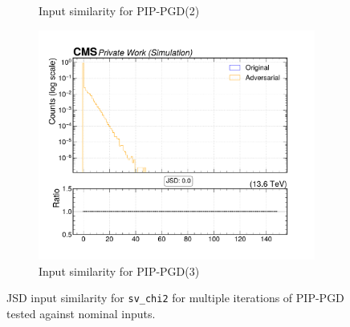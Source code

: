 \begin{figure}[htbp]
\begin{subfigure}[t]{0.32\textwidth}
    \caption*{Input similarity for PIP-PGD(2)}
  \end{subfigure}\hfill
  \begin{subfigure}[t]{0.32\textwidth}
    \includegraphics[width=\linewidth]{media/output/features/compare/combined_it_3/cmp_vtx_arr_sv_chi2.pdf}
    \caption*{Input similarity for PIP-PGD(3)}
  \end{subfigure}

  \caption*{JSD input similarity for \texttt{sv\_chi2} for multiple iterations of PIP-PGD tested against nominal inputs.}
  \label{fig:combined_input_sv_chi2}
\end{figure}

